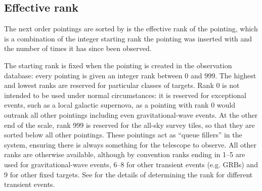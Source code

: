 \subsection{Effective rank}
\label{sec:rank}
\begin{colsection}

The next order pointings are sorted by is the effective rank of the pointing, which is a combination of the integer starting rank the pointing was inserted with and the number of times it has since been observed.

The starting rank is fixed when the pointing is created in the observation database: every pointing is given an integer rank between 0 and 999. The highest and lowest ranks are reserved for particular classes of targets. Rank 0 is not intended to be used under normal circumstances: it is reserved for exceptional events, such as a local galactic supernova, as a pointing with rank 0 would outrank all other pointings including even gravitational-wave events. At the other end of the scale, rank 999 is reserved for the all-sky survey tiles, so that they are sorted below all other pointings. These pointings act as ``queue fillers'' in the system, ensuring there is always something for the telescope to observe. All other ranks are otherwise available, although by convention ranks ending in 1--5 are used for gravitational-wave events, 6--8 for other transient events (e.g. GRBs) and 9 for other fixed targets. See  for the details of determining the rank for different transient events.


\end{colsection}

